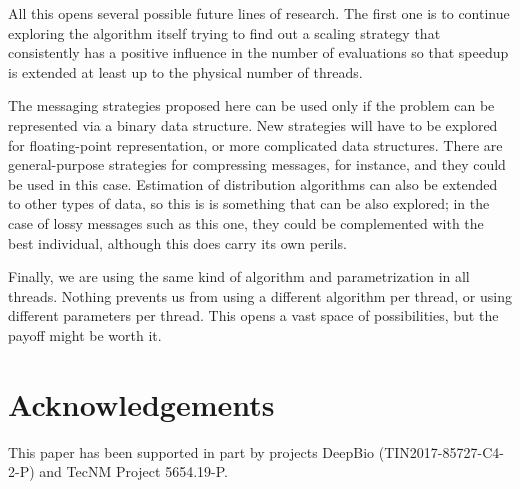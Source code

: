 \documentclass[runningheads]{llncs}\usepackage[]{graphicx}\usepackage[]{color}
\begin{document}
All this opens several possible future lines of research. The first
one is to continue exploring the 
algorithm itself trying to find out a scaling strategy that
consistently has a positive  influence in the number of evaluations so
that speedup is extended at least up to the physical number of
threads.

The messaging strategies proposed here can be used only if the problem
can be represented via a binary data structure. New strategies will
have to be explored for floating-point representation, or more
complicated data structures. There are general-purpose strategies for
compressing messages, for instance, and they could be used in this
case. Estimation of distribution algorithms can also be extended to
other types of data, so this is is something that can be also
explored; in the case of lossy messages such as this one, they could
be complemented with the best individual, although this does carry its
own perils.

Finally, we are using the same kind of algorithm and parametrization in all
threads. Nothing prevents us from using a different algorithm per
thread, or using different parameters per thread. This opens a vast
space of possibilities, but the payoff might be worth it.

\section{Acknowledgements}
This paper has been supported in part by
projects DeepBio (TIN2017-85727-C4-2-P) and TecNM Project 5654.19-P. 



 
\end{document}
